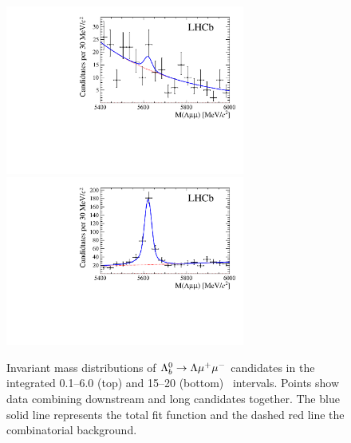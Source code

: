 \begin{figure}
\centering
\includegraphics[width=0.7\textwidth]{Lmumu/figs/paper/figure13.pdf}
\includegraphics[width=0.7\textwidth]{Lmumu/figs/paper/figure2.pdf}
\caption{Invariant mass distributions of $\Lambda^0_b\rightarrow\Lambda\mu^+\mu^-$ candidates in the integrated 0.1--6.0 \gevgevcccc(top)
and 15--20 \gevgevcccc (bottom) ~\qsq intervals. Points show data combining downstream and long candidates together.
The blue solid line represents the total fit function and the dashed red line the combinatorial background.}
\label{fig:Lb_Lmumu}
\end{figure}
%
